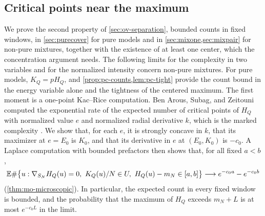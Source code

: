 \subsection{Critical points near the maximum}\label{sec:ov-counts}

We prove the second property of \cref{sec:ov-separation}, bounded counts in fixed windows, in \cref{sec:purecover} for pure models and in \cref{sec:mixone,sec:mixpair} for non-pure mixtures, together with the existence of at least one center, which the concentration argument needs. The following limits for the complexity in two variables and for the normalized intensity concern non-pure mixtures. For pure models, $K_Q=pH_Q$, and \cref{prop:pc-counts,lem:pc-tight} provide the count bound in the energy variable alone and the tightness of the centered maximum. The first moment is a one-point Kac--Rice computation. Ben Arous, Subag, and Zeitouni computed the exponential rate of the expected number of critical points of $H_Q$ with normalized value $e$ and normalized radial derivative $k$, which is the marked complexity \cite{BenArousSubagZeitouni2020}. We show that, for each $e$, it is strongly concave in $k$, that its maximizer at $e=E_0$ is $K_0$, and that its derivative in $e$ at $(E_0,K_0)$ is $-c_0$. A Laplace computation with bounded prefactors then shows that, for all fixed $a<b$,
\begin{equation}\label{eq:ov-first-moment}
\E\#\bigl\{u:\nabla_{S_N}H_Q(u)=0,\ K_Q(u)/N\in U,\ H_Q(u)-m_N\in[a,b]\bigr\}\longrightarrow e^{-c_0a}-e^{-c_0b}
\end{equation}
(\cref{thm:mo-microscopic}). In particular, the expected count in every fixed window is bounded, and the probability that the maximum of $H_Q$ exceeds $m_N+L$ is at most $e^{-c_0L}$ in the limit.

